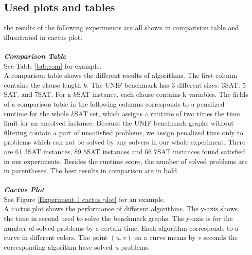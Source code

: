 \documentclass[12pt,a4paper,twoside]{scrartcl}
\numberwithin{equation}{section}
\begin{document}
\subsection{Used plots and tables}
the results of the following experiments are all shown in comparision table and  illusatrated in cactus plot.  \\
\\
\emph{\textbf{Comparison Table}}\\
See Table \ref{tab:com} for example.\\
A comparison table shows the different results of algorithms. The first column contains the
clause length $k$. The UNIF benchmark has $3$ different sizes: $3$SAT, $5$SAT, and $7$SAT. For a $k$SAT instance, each clause contains k variables.  The fields of a comparison table in the following columns corresponds to a penalized runtime for the whole $k$SAT set, which assigns a runtime of two times the time limit for an unsolved instance. Because the UNIF benchmark graphs without filtering contain a part of unsatisfied problems, we assign penalized time only to problems which can not be solved by any solvers in our whole experiment. There are 61 $3$SAT instances, 89 $5$SAT instances and 66 $7$SAT instances found satisfied in our experiments. Besides the runtime score, the number of solved problems are in parentheses. The best results in comparison are in bold.
\\
\\
\emph{\textbf{Cactus Plot}}\\
See Figure \ref{Experiment 1 cactus plot} for an example.\\
A cactus plot shows the performance of different algorithms. The y-axis shows the time in second used to solve the benchmark graphs.  The y-axis is for the number of solved problems by a certain time. Each algorithm corresponds to a curve in different colors. The point $(u, v)$ on a curve means by $v$ seconds the corresponding algorithm have solved  $u$ problems.  \\
\end{document}
